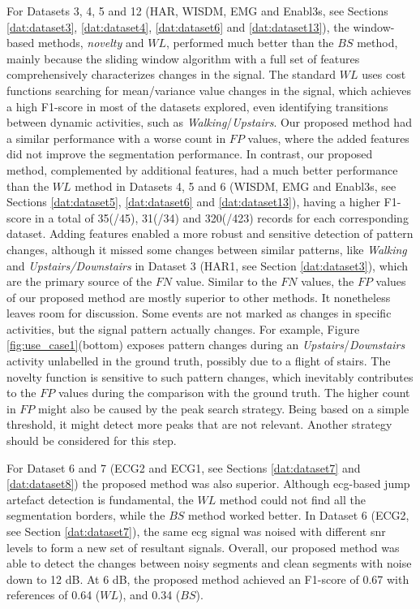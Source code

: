 For Datasets 3, 4, 5 and 12 (HAR, WISDM, EMG and Enabl3s, see Sections \ref{dat:dataset3}, \ref{dat:dataset4}, \ref{dat:dataset6} and \ref{dat:dataset13}), the window-based methods, \textit{novelty} and $WL$, performed much better than the $BS$ method, mainly because the sliding window algorithm with a full set of features comprehensively characterizes changes in the signal.
The standard $WL$ uses cost functions searching for mean/variance value changes in the signal, which achieves a high F1-score in most of the datasets explored, even identifying transitions between dynamic activities, such as \textit{Walking}/\textit{Upstairs}.
Our proposed method had a similar performance with a worse count in $FP$ values, where the added features did not improve the segmentation performance.
In contrast, our proposed method, complemented by additional features, had a much better performance than the $WL$ method in Datasets 4, 5 and 6 (WISDM, EMG and Enabl3s, see Sections \ref{dat:dataset5}, \ref{dat:dataset6} and \ref{dat:dataset13}), having a higher F1-score in a total of 35(/45), 31(/34) and 320(/423) records for each corresponding dataset.
Adding features enabled a more robust and sensitive detection of pattern changes, although it missed some changes between similar patterns, like \textit{Walking} and \textit{Upstairs/Downstairs} in Dataset 3 (HAR1, see Section \ref{dat:dataset3}), which are the primary source of the $FN$ value.
Similar to the $FN$ values, the $FP$ values of our proposed method are mostly superior to other methods. It nonetheless leaves room for discussion. Some events are not marked as changes in specific activities, but the signal pattern actually changes. For example, Figure \ref{fig:use_case1}(bottom) exposes pattern changes during an \textit{Upstairs}/\textit{Downstairs} activity unlabelled in the ground truth, possibly due to a flight of stairs. The novelty function is sensitive to such pattern changes, which inevitably contributes to the $FP$ values during the comparison with the ground truth. The higher count in $FP$ might also be caused by the peak search strategy. Being based on a simple threshold, it might detect more peaks that are not relevant. Another strategy should be considered for this step.

For Dataset 6 and 7 (ECG2 and ECG1, see Sections \ref{dat:dataset7} and \ref{dat:dataset8}) the proposed method was also superior. Although \gls{ecg}-based jump artefact detection is fundamental, the $WL$ method could not find all the segmentation borders, while the $BS$ method worked better. In Dataset 6 (ECG2, see Section \ref{dat:dataset7}), the same \gls{ecg} signal was noised with different \gls{snr} levels to form a new set of resultant signals. Overall, our proposed method was able to detect the changes between noisy segments and clean segments with noise down to 12 dB. At 6 dB, the proposed method achieved an F1-score of 0.67 with references of 0.64 ($WL$), and 0.34 ($BS$).

